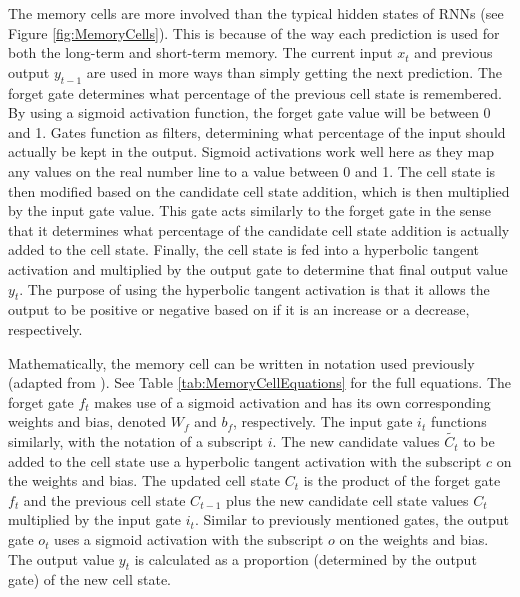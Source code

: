 The memory cells are more involved than the typical hidden states of RNNs (see Figure \ref{fig:MemoryCells}). This is because of the way each prediction is used for both the long-term and short-term memory. The current input $x_t$ and previous output $y_{t-1}$ are used in more ways than simply getting the next prediction. The forget gate determines what percentage of the previous cell state is remembered. By using a sigmoid activation function, the forget gate value will be between 0 and 1. Gates function as filters, determining what percentage of the input should actually be kept in the output. Sigmoid activations work well here as they map any values on the real number line to a value between 0 and 1. The cell state is then modified based on the candidate cell state addition, which is then multiplied by the input gate value. This gate acts similarly to the forget gate in the sense that it determines what percentage of the candidate cell state addition is actually added to the cell state. Finally, the cell state is fed into a hyperbolic tangent activation and multiplied by the output gate to determine that final output value $y_t$. The purpose of using the hyperbolic tangent activation is that it allows the output to be positive or negative based on if it is an increase or a decrease, respectively.

Mathematically, the memory cell can be written in notation used previously (adapted from \cite{understandinglstm}). See Table \ref{tab:MemoryCellEquations} for the full equations. The forget gate $f_t$ makes use of a sigmoid activation and has its own corresponding weights and bias, denoted $W_f$ and $b_f$, respectively. The input gate $i_t$ functions similarly, with the notation of a subscript $i$. The new candidate values $\tilde{C_t}$ to be added to the cell state use a hyperbolic tangent activation with the subscript $c$ on the weights and bias. The updated cell state $C_t$ is the product of the forget gate $f_t$ and the previous cell state $C_{t-1}$ plus the new candidate cell state values $C_{t}$ multiplied by the input gate $i_t$. Similar to previously mentioned gates, the output gate $o_t$ uses a sigmoid activation with the subscript $o$ on the weights and bias. The output value $y_t$ is calculated as a proportion (determined by the output gate) of the new cell state.

